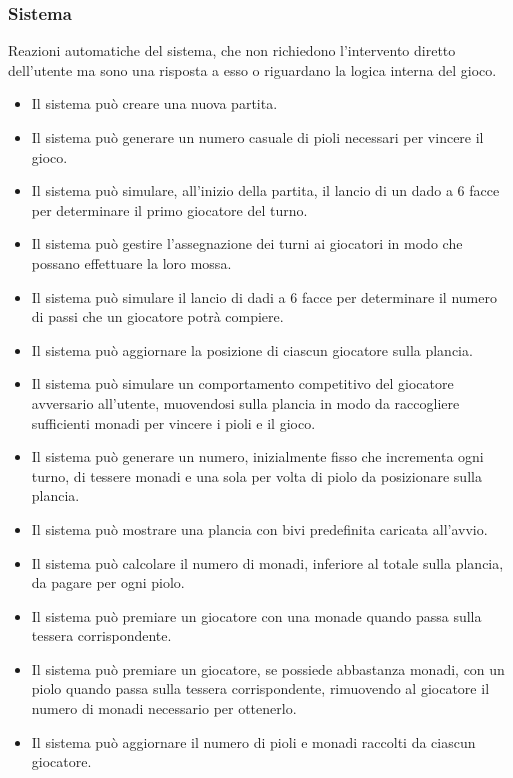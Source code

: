 \subsubsection{Sistema} \label{sec:functional-requirements:system}
Reazioni automatiche del sistema, che non richiedono l'intervento
diretto dell'utente ma sono una risposta a esso o riguardano la logica interna del gioco.
\begin{itemize}
      \item Il sistema può creare una nuova partita.
      \item Il sistema può generare un numero casuale di pioli necessari per vincere il gioco.
      \item Il sistema può simulare, all'inizio della partita, il lancio di un dado a 6 
            facce per determinare il primo giocatore del turno.
      \item Il sistema può gestire l'assegnazione dei turni ai giocatori in modo che possano
            effettuare la loro mossa.
      \item Il sistema può simulare il lancio di dadi a 6 facce per determinare il numero di
            passi che un giocatore potrà compiere.
      \item Il sistema può aggiornare la posizione di ciascun giocatore sulla plancia.
      \item Il sistema può simulare un comportamento competitivo del giocatore avversario 
            all'utente, muovendosi sulla plancia in modo da raccogliere sufficienti monadi
            per vincere i pioli e il gioco.
      \item Il sistema può generare un numero, inizialmente fisso che incrementa ogni turno, 
            di tessere monadi e una sola per volta di piolo da posizionare sulla plancia.
      \item Il sistema può mostrare una plancia con bivi predefinita caricata all'avvio. 
      \item Il sistema può calcolare il numero di monadi, inferiore al totale sulla plancia, 
            da pagare per ogni piolo.
      \item Il sistema può premiare un giocatore con una monade quando passa sulla tessera 
            corrispondente.
      \item Il sistema può premiare un giocatore, se possiede abbastanza monadi, con un
            piolo quando passa sulla tessera corrispondente, rimuovendo al giocatore il
            numero di monadi necessario per ottenerlo.
      \item Il sistema può aggiornare il numero di pioli e monadi raccolti da ciascun giocatore.

\end{itemize}

